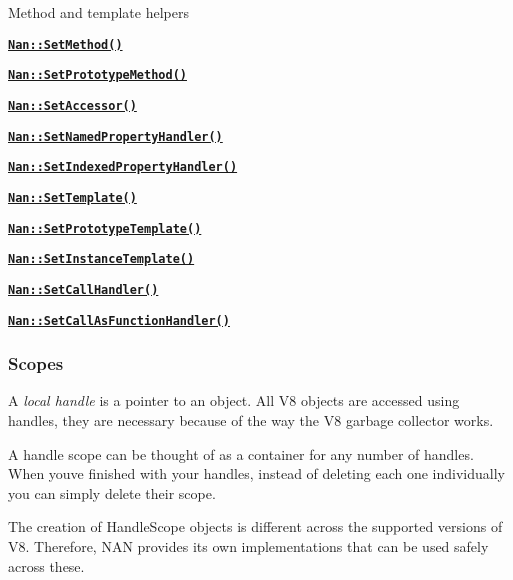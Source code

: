 \begin{DoxyItemize}
\item Method and template helpers
\begin{DoxyItemize}
\item \href{doc/methods.md#api_nan_set_method}{\tt {\bfseries {\ttfamily Nan\+::\+Set\+Method()}}}
\item \href{doc/methods.md#api_nan_set_prototype_method}{\tt {\bfseries {\ttfamily Nan\+::\+Set\+Prototype\+Method()}}}
\item \href{doc/methods.md#api_nan_set_accessor}{\tt {\bfseries {\ttfamily Nan\+::\+Set\+Accessor()}}}
\item \href{doc/methods.md#api_nan_set_named_property_handler}{\tt {\bfseries {\ttfamily Nan\+::\+Set\+Named\+Property\+Handler()}}}
\item \href{doc/methods.md#api_nan_set_indexed_property_handler}{\tt {\bfseries {\ttfamily Nan\+::\+Set\+Indexed\+Property\+Handler()}}}
\item \href{doc/methods.md#api_nan_set_template}{\tt {\bfseries {\ttfamily Nan\+::\+Set\+Template()}}}
\item \href{doc/methods.md#api_nan_set_prototype_template}{\tt {\bfseries {\ttfamily Nan\+::\+Set\+Prototype\+Template()}}}
\item \href{doc/methods.md#api_nan_set_instance_template}{\tt {\bfseries {\ttfamily Nan\+::\+Set\+Instance\+Template()}}}
\item \href{doc/methods.md#api_nan_set_call_handler}{\tt {\bfseries {\ttfamily Nan\+::\+Set\+Call\+Handler()}}}
\item \href{doc/methods.md#api_nan_set_call_as_function_handler}{\tt {\bfseries {\ttfamily Nan\+::\+Set\+Call\+As\+Function\+Handler()}}}
\end{DoxyItemize}
\end{DoxyItemize}

\subsubsection*{Scopes}

A {\itshape local handle} is a pointer to an object. All V8 objects are accessed using handles, they are necessary because of the way the V8 garbage collector works.

A handle scope can be thought of as a container for any number of handles. When you\textquotesingle{}ve finished with your handles, instead of deleting each one individually you can simply delete their scope.

The creation of {\ttfamily Handle\+Scope} objects is different across the supported versions of V8. Therefore, N\+AN provides its own implementations that can be used safely across these.



